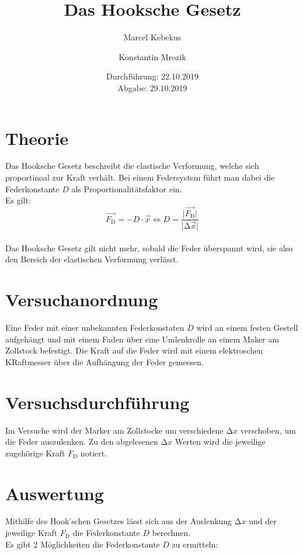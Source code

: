 \documentclass[titlepage = firstcover]{scrartcl}
\title{Das Hooksche Gesetz}
\author{Marcel Kebekus \and Konstantin Mrozik}
\date{%
  Durchführung: 22.10.2019 \\
  Abgabe: 29.10.2019
  }
\begin{document}
\maketitle
\thispagestyle{empty}
\tableofcontents
\newpage

\section{Theorie}
\label{sec:Theorie}
Das Hooksche Gesetz beschreibt die elastische Verformung, welche sich
proportinoal zur Kraft verhält.
Bei einem Federsystem führt man dabei die Federkonstante $D$ als Proportionalitätsfaktor ein.\\
Es gilt:
\\
\begin{equation}
  \vec{F_{\text{D}}}=-D \cdot \vec{x} \iff D=\frac{\lvert\vec{F_{\text{D}}}\rvert}{\lvert\increment\vec{x}\rvert}
  \label{eqn:Formel}
\end{equation}
\\
Das Hooksche Gesetz gilt nicht mehr, sobald die Feder überspannt wird, sie also den Bereich der
elastischen Verformung verlässt.


\section{Versuchanordnung}
\label{sec:Versuchsanordnung}
Eine Feder mit einer unbekannten Federkonstaten $D$ wird an einem festen Gestell aufgehängt
und mit einem Faden über eine Umlenkrolle an einem Maker am Zollstock befestigt. 
Die Kraft auf die Feder wird mit einem elektroschen KRaftmesser über die Aufhängung der Feder gemessen.


\section{Versuchsdurchführung}
\label{sec:Versuchsdurchführung}
Im Versuche wird der Marker am Zollstocke um verschiedene $\increment x$ verschoben, um die Feder
auszulenken.
Zu den abgelesenen $\increment x$ Werten wird die jeweilige zugehörige Kraft $F_{\text{D}}$ notiert.

\newpage

\section{Auswertung}
\label{sec:Auswertung}
Mithilfe des Hook'schen Gesetzes lässt sich aus der Auslenkung $\increment x$ und der jeweilige
Kraft $F_{\text{D}}$ die Federkonstante $D$ berechnen.\\
Es gibt 2 Möglichkeiten die Federkonstante $D$ zu ermitteln:
\end{document}

